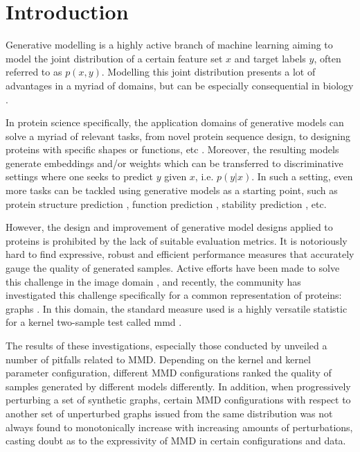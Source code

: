 \chapter{Introduction}


Generative modelling is a highly active branch of machine learning aiming to
model the joint distribution of a certain feature set $x$ and target labels $y$,
often referred to as $p(x,y)$. Modelling this joint distribution presents a lot
of advantages in a myriad of domains, but can be especially
consequential in biology \citep{lopez2020enhancing,strokach2022deep}.

In protein science specifically, the application domains of generative models
can solve a myriad of relevant tasks, from novel protein sequence design, to
designing proteins with specific shapes or functions, etc
\citep{jendrusch2021alphadesign,madani2021deep}. Moreover, the resulting models generate
embeddings and/or weights which can be transferred to discriminative settings
where one seeks to predict $y$ given $x$, i.e. $p(y|x)$. In such a setting, even
more tasks can be tackled using generative models as a starting point, such as protein
structure prediction \citep{jumper2021highly}, function prediction
\citep{meier2021language}, stability prediction \citep{strokach2020fast}, etc.

However, the design and improvement of generative model designs applied to
proteins is prohibited by the lack of suitable evaluation metrics. It is
notoriously hard to find expressive, robust and efficient performance measures
that accurately gauge the quality of generated samples. Active efforts have been
made to solve this challenge in the image domain \citep{heusel2017gans}, and
recently, the community has investigated this challenge specifically for a
common representation of proteins: graphs \citep{thompson2022evaluation,
o2021evaluation}. In this domain, the standard measure used is a highly
versatile statistic for a kernel two-sample test called \acrfull{mmd}
\citep{gretton2012kernel}.

The results of these investigations, especially those conducted by
\cite{o2021evaluation} unveiled a number of pitfalls related to MMD. Depending
on the kernel and kernel parameter configuration, different MMD configurations
ranked the quality of samples generated by different models differently. In
addition, when progressively perturbing a set of synthetic graphs, certain MMD
configurations with respect to another set of unperturbed graphs issued from the
same distribution was not always found to monotonically increase with increasing
amounts of perturbations, casting doubt as to the expressivity of MMD in certain
configurations and data.

